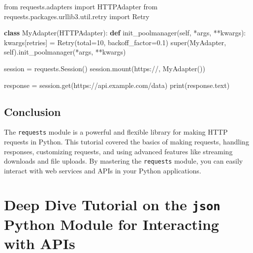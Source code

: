 \documentclass[
  letterpaper,
  DIV=11,
  numbers=noendperiod]{scrreprt}
\newenvironment{Shaded}{\begin{snugshade}}{\end{snugshade}}
\newcommand{\BuiltInTok}[1]{\textcolor[rgb]{0.00,0.23,0.31}{#1}}
\newcommand{\DecValTok}[1]{\textcolor[rgb]{0.68,0.00,0.00}{#1}}
\newcommand{\FloatTok}[1]{\textcolor[rgb]{0.68,0.00,0.00}{#1}}
\newcommand{\ImportTok}[1]{\textcolor[rgb]{0.00,0.46,0.62}{#1}}
\newcommand{\KeywordTok}[1]{\textcolor[rgb]{0.00,0.23,0.31}{\textbf{#1}}}
\newcommand{\NormalTok}[1]{\textcolor[rgb]{0.00,0.23,0.31}{#1}}
\newcommand{\OperatorTok}[1]{\textcolor[rgb]{0.37,0.37,0.37}{#1}}
\newcommand{\StringTok}[1]{\textcolor[rgb]{0.13,0.47,0.30}{#1}}
\newcommand{\VariableTok}[1]{\textcolor[rgb]{0.07,0.07,0.07}{#1}}
\begin{document}
\begin{Shaded}
\begin{Highlighting}[]
\ImportTok{from}\NormalTok{ requests.adapters }\ImportTok{import}\NormalTok{ HTTPAdapter}
\ImportTok{from}\NormalTok{ requests.packages.urllib3.util.retry }\ImportTok{import}\NormalTok{ Retry}

\KeywordTok{class}\NormalTok{ MyAdapter(HTTPAdapter):}
    \KeywordTok{def}\NormalTok{ init\_poolmanager(}\VariableTok{self}\NormalTok{, }\OperatorTok{*}\NormalTok{args, }\OperatorTok{**}\NormalTok{kwargs):}
\NormalTok{        kwargs[}\StringTok{\textquotesingle{}retries\textquotesingle{}}\NormalTok{] }\OperatorTok{=}\NormalTok{ Retry(total}\OperatorTok{=}\DecValTok{10}\NormalTok{, backoff\_factor}\OperatorTok{=}\FloatTok{0.1}\NormalTok{)}
        \BuiltInTok{super}\NormalTok{(MyAdapter, }\VariableTok{self}\NormalTok{).init\_poolmanager(}\OperatorTok{*}\NormalTok{args, }\OperatorTok{**}\NormalTok{kwargs)}

\NormalTok{session }\OperatorTok{=}\NormalTok{ requests.Session()}
\NormalTok{session.mount(}\StringTok{\textquotesingle{}https://\textquotesingle{}}\NormalTok{, MyAdapter())}

\NormalTok{response }\OperatorTok{=}\NormalTok{ session.get(}\StringTok{\textquotesingle{}https://api.example.com/data\textquotesingle{}}\NormalTok{)}
\BuiltInTok{print}\NormalTok{(response.text)}
\end{Highlighting}
\end{Shaded}

\section{Conclusion}\label{conclusion-18}

The \texttt{requests} module is a powerful and flexible library for
making HTTP requests in Python. This tutorial covered the basics of
making requests, handling responses, customizing requests, and using
advanced features like streaming downloads and file uploads. By
mastering the \texttt{requests} module, you can easily interact with web
services and APIs in your Python applications.


\chapter{\texorpdfstring{Deep Dive Tutorial on the \texttt{json} Python
Module for Interacting with
APIs}{Deep Dive Tutorial on the json Python Module for Interacting with APIs}}\label{deep-dive-tutorial-on-the-json-python-module-for-interacting-with-apis}
\end{document}
